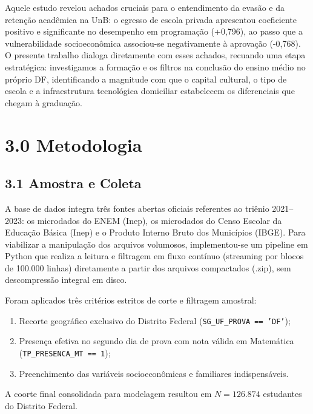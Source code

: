 \documentclass[twocolumn,10pt,a4paper]{article}
\begin{document}
Aquele estudo revelou achados cruciais para o entendimento da evasão e da retenção acadêmica na UnB: o egresso de escola privada apresentou coeficiente positivo e significante no desempenho em programação (+0,796), ao passo que a vulnerabilidade socioeconômica associou-se negativamente à aprovação (-0,768). O presente trabalho dialoga diretamente com esses achados, recuando uma etapa estratégica: investigamos a formação e os filtros na conclusão do ensino médio no próprio DF, identificando a magnitude com que o capital cultural, o tipo de escola e a infraestrutura tecnológica domiciliar estabelecem os diferenciais que chegam à graduação.

\section*{3.0 Metodologia}

\subsection*{3.1 Amostra e Coleta}

A base de dados integra três fontes abertas oficiais referentes ao triênio 2021--2023: os microdados do ENEM (Inep), os microdados do Censo Escolar da Educação Básica (Inep) e o Produto Interno Bruto dos Municípios (IBGE). Para viabilizar a manipulação dos arquivos volumosos, implementou-se um pipeline em Python que realiza a leitura e filtragem em fluxo contínuo (streaming por blocos de 100.000 linhas) diretamente a partir dos arquivos compactados (.zip), sem descompressão integral em disco.

Foram aplicados três critérios estritos de corte e filtragem amostral:
\begin{enumerate}
  \item Recorte geográfico exclusivo do Distrito Federal (\texttt{SG\_UF\_PROVA == 'DF'});
  \item Presença efetiva no segundo dia de prova com nota válida em Matemática (\texttt{TP\_PRESENCA\_MT == 1});
  \item Preenchimento das variáveis socioeconômicas e familiares indispensáveis.
\end{enumerate}
A coorte final consolidada para modelagem resultou em $N = 126.874$ estudantes do Distrito Federal.
\end{document}
